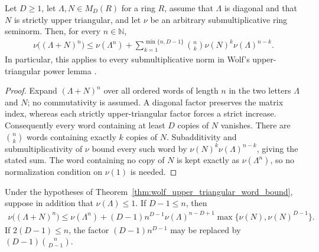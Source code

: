 
\begin{theorem}
    \label{thm:wolf_upper_triangular_word_bound}
    \leanok
    Let $D\ge 1$, let $\Lambda,N\in M_D(R)$ for a ring $R$, assume that $\Lambda$ is
    diagonal and that $N$ is strictly upper triangular, and let $\nu$ be an
    arbitrary submultiplicative ring seminorm.  Then, for every
    $n\in\mathbb N$,
    \begin{align}
      \nu\bigl((\Lambda+N)^n\bigr)
      \le \nu(\Lambda^n)
      +\sum_{k=1}^{\min\{n,D-1\}}
        \binom{n}{k}\nu(N)^k\nu(\Lambda)^{n-k}.
    \end{align}
    In particular, this applies to every submultiplicative norm in Wolf's
    upper-triangular power lemma
    \cite[Chapter~8, Equation~(8.105)]{Wolf2012Quantum}.
\end{theorem}

\begin{proof}
    \leanok
    Expand $(\Lambda+N)^n$ over all ordered words of length $n$ in the two
    letters $\Lambda$ and $N$; no commutativity is assumed.  A diagonal factor
    preserves the matrix index, whereas each strictly upper-triangular factor
    forces a strict increase.  Consequently every word containing at least
    $D$ copies of $N$ vanishes.  There are $\binom{n}{k}$ words containing
    exactly $k$ copies of $N$.  Subadditivity and submultiplicativity of $\nu$
    bound every such word by $\nu(N)^k\nu(\Lambda)^{n-k}$, giving the stated
    sum.  The word containing no copy of $N$ is kept exactly as
    $\nu(\Lambda^n)$, so no normalization condition on $\nu(1)$ is needed.
\end{proof}

\begin{theorem}
    \label{thm:wolf_upper_triangular_power_estimate}
    \leanok
    Under the hypotheses of Theorem~\ref{thm:wolf_upper_triangular_word_bound},
    suppose in addition that $\nu(\Lambda)\le 1$.  If $D-1\le n$, then
    \begin{align}
      \nu\bigl((\Lambda+N)^n\bigr)
      \le \nu(\Lambda^n)
      +(D-1)n^{D-1}\nu(\Lambda)^{n-D+1}
        \max\{\nu(N),\nu(N)^{D-1}\}.
    \end{align}
    If $2(D-1)\le n$, the factor $(D-1)n^{D-1}$ may be replaced by
    $(D-1)\binom{n}{D-1}$.
\end{theorem}

